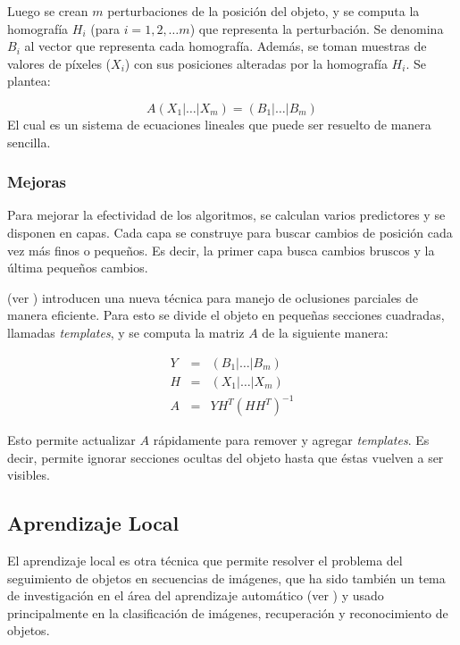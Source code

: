Luego se crean $m$ perturbaciones de la posición del objeto, y se computa la
homografía $H_i$ (para $i = 1, 2, \dots m$) que representa la perturbación.
Se denomina $B_i$ al vector que representa cada homografía. Además, se toman
muestras de valores de píxeles ($X_i$) con sus posiciones alteradas por la
homografía $H_i$. Se plantea:

\begin{equation}
    A \left( X_1 \lvert \dots \lvert X_m \right) = \left( B_1 \lvert \dots \lvert B_m \right)
\end{equation}
El cual es un sistema de ecuaciones lineales que puede ser resuelto de manera sencilla.

\subsubsection{Mejoras}

Para mejorar la efectividad de los algoritmos, se calculan varios predictores y se disponen en capas.
Cada capa se construye para buscar cambios de posición cada vez más finos o pequeños.
Es decir, la primer capa busca cambios bruscos y la última pequeños cambios.

\citeauthor*{alp} (ver \cite{alp}) introducen una nueva técnica para manejo de oclusiones
parciales de manera eficiente. Para esto se divide el objeto en pequeñas
secciones cuadradas, llamadas \textit{templates}, y se computa la matriz $A$ de
la siguiente manera:

\begin{eqnarray*}
    Y &=& \left( B_1 \lvert \dots \lvert B_m \right) \\
    H &=& \left( X_1 \lvert \dots \lvert X_m \right) \\
    A &=& Y H^T(HH^T)^{-1}
\end{eqnarray*}

Esto permite actualizar $A$
rápidamente para remover y agregar \textit{templates}. Es decir, permite ignorar
secciones ocultas del objeto hasta que éstas vuelven a ser visibles.

\subsection{Aprendizaje Local}

El aprendizaje local es otra técnica que permite resolver el problema del
seguimiento de objetos en secuencias de imágenes, que ha sido también un tema
de investigación en el área del aprendizaje automático (ver
\cite{local-learning-machine-learning}) y usado principalmente en la
clasificación de imágenes, recuperación y reconocimiento de objetos.

